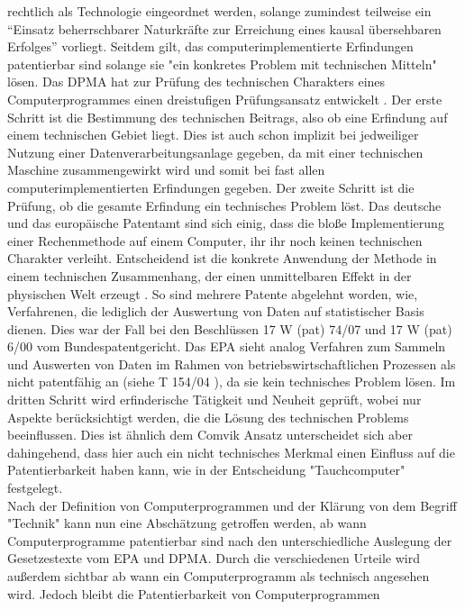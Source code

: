 rechtlich als Technologie eingeordnet werden, solange 
zumindest teilweise ein 
“Einsatz beherrschbarer Naturkräfte zur Erreichung eines kausal übersehbaren Erfolges”
vorliegt. Seitdem gilt,
das computerimplementierte Erfindungen patentierbar sind
solange sie "ein konkretes Problem mit technischen Mitteln" lösen.
Das DPMA hat zur Prüfung des technischen Charakters eines 
Computerprogrammes einen dreistufigen Prüfungsansatz entwickelt \cite{DPMAPatentschutz}.
Der erste Schritt ist die Bestimmung des technischen Beitrags,
also ob eine Erfindung auf einem technischen Gebiet liegt. 
Dies ist auch schon implizit bei jedweiliger Nutzung einer Datenverarbeitungsanlage
gegeben, da mit einer technischen Maschine zusammengewirkt wird
und somit bei fast allen computerimplementierten Erfindungen gegeben.
Der zweite Schritt ist die Prüfung, ob die gesamte Erfindung ein technisches Problem löst.
Das deutsche und das europäische Patentamt sind sich einig,
dass die bloße Implementierung 
einer Rechenmethode auf einem Computer, ihr
ihr noch keinen technischen Charakter verleiht. 
Entscheidend ist die konkrete Anwendung der Methode 
in einem technischen Zusammenhang, der einen unmittelbaren Effekt in der 
physischen Welt erzeugt \cite{melullisEPUArt522023}.
So sind mehrere Patente abgelehnt worden,
wie, Verfahrenen, 
die lediglich der Auswertung von Daten auf statistischer Basis dienen.
Dies war der Fall bei den Beschlüssen 17 W (pat) 74/07\cite{BPatG10012012}
und 17 W (pat) 6/00 \cite{BPatG01032001} vom Bundespatentgericht.
Das EPA sieht analog Verfahren zum Sammeln und Auswerten von Daten 
im Rahmen von betriebswirtschaftlichen Prozessen als nicht patentfähig an 
(siehe T 154/04 \cite{EuropaischesPatentamt152006}),
da sie kein technisches Problem lösen.
Im dritten Schritt wird erfinderische Tätigkeit und Neuheit 
geprüft, wobei nur Aspekte berücksichtigt werden,
die die Lösung des technischen Problems beeinflussen.
Dies ist ähnlich dem Comvik Ansatz unterscheidet sich
aber dahingehend, dass hier auch ein nicht technisches
Merkmal einen Einfluss auf die Patentierbarkeit haben kann,
wie in der Entscheidung "Tauchcomputer" festgelegt.
\\
Nach der Definition von Computerprogrammen und der Klärung von dem Begriff
"Technik" kann nun eine Abschätzung getroffen werden, 
ab wann Computerprogramme patentierbar sind nach den
unterschiedliche Auslegung der Gesetzestexte vom EPA und DPMA. 
Durch die verschiedenen Urteile wird außerdem sichtbar 
ab wann ein Computerprogramm als technisch angesehen wird.
Jedoch bleibt die Patentierbarkeit von Computerprogrammen 
